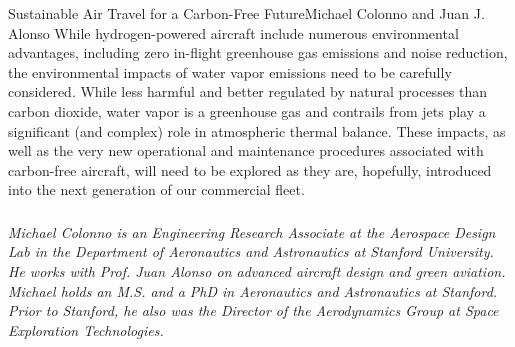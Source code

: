 \documentclass[10pt]{papertex}
\begin{document}
\begin{news}{2}{Sustainable Air Travel for a Carbon-Free Future}{Michael Colonno and Juan J. Alonso}{}{}
While hydrogen-powered aircraft include numerous environmental advantages, 
including zero in-flight greenhouse gas emissions and noise reduction, the 
environmental impacts of water vapor emissions need to be carefully considered. 
While less harmful and better regulated by natural processes than carbon 
dioxide, water vapor is a greenhouse gas and contrails from jets play a 
significant (and complex) role in atmospheric thermal balance. These impacts, 
as well as the very new operational and maintenance procedures associated 
with carbon-free aircraft, will need to be explored as they are, hopefully, 
introduced into the next generation of our commercial fleet.

\subsubsection*{}

\emph{Michael Colonno is an Engineering Research Associate at the Aerospace 
Design Lab in the Department of Aeronautics and Astronautics at Stanford 
University. He works with Prof. Juan Alonso on advanced aircraft design and 
green aviation. Michael holds an M.S. and a PhD in Aeronautics and Astronautics 
at Stanford. Prior to Stanford, he also was the Director of the Aerodynamics 
Group at Space Exploration Technologies.}

\end{news}
\end{document}
